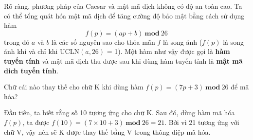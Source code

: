 Rõ ràng, phương pháp của Caesar và mật mã dịch không có độ an toàn cao.
Ta có thể tổng quát hóa mật mã dịch để tăng cường độ bảo mật
bằng cách sử dụng hàm
$$f(p) = (ap+b)\ \mathbf{mod}\ 26$$
trong đó $a$ và $b$ là các số nguyên sao cho thỏa mãn $f$ là song ánh ($f(p)$ là song ánh khi và chỉ khi
UCLN$(a,26)$ = 1). Một hàm như vậy được gọi là \textbf{hàm tuyến tính} và mật mã dịch thu được sau khi dùng hàm tuyến tính là \textbf{mật mã dich tuyến tính}.
\begin{example}
    Chữ cái nào thay thế cho chữ K khi dùng hàm $f(p) = (7p + 3)\ \textbf{mod}\ 26$ để mã hóa?
\end{example}
\begin{solution}
    Đầu tiên, ta biết rằng số 10 tương ứng cho chữ K. Sau đó, dùng hàm mã hóa
    $f(p)$, ta được $f (10) = (7 \times 10 + 3)\ \textbf{mod}\ 26 = 21$. Bởi vì 21 tương ứng
    với chữ V, vậy nên sẽ K được thay thế bằng V trong thông điệp mã hóa.
\end{solution}